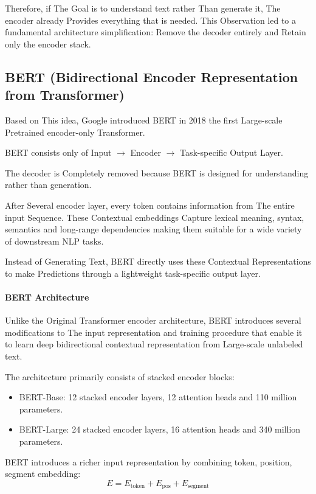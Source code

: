 Therefore, if The Goal is to understand text rather Than generate it, The encoder already Provides everything that is needed. This Observation led to a fundamental architecture simplification: Remove the decoder entirely and Retain only the encoder stack.

\subsection{BERT (Bidirectional Encoder Representation from Transformer)}

Based on This idea, Google introduced BERT in 2018 the first Large-scale Pretrained encoder-only Transformer.

BERT consists only of Input $\longrightarrow$ Encoder $\longrightarrow$ Task-specific Output Layer.

The decoder is Completely removed because BERT is designed for understanding rather than generation.

After Several encoder layer, every token contains information from The entire input Sequence. These Contextual embeddings Capture lexical meaning, syntax, semantics and long-range dependencies making them suitable for a wide variety of downstream NLP tasks.

Instead of Generating Text, BERT directly uses these Contextual Representations to make Predictions through a lightweight task-specific output layer.

\paragraph{BERT Architecture}
Unlike the Original Transformer encoder architecture, BERT introduces several modifications to The input representation and training procedure that enable it to learn deep bidirectional contextual representation from Large-scale unlabeled text.

The architecture primarily consists of stacked encoder blocks:
\begin{itemize}
    \item BERT-Base: 12 stacked encoder layers, 12 attention heads and 110 million parameters.
    \item BERT-Large: 24 stacked encoder layers, 16 attention heads and 340 million parameters.
\end{itemize}

BERT introduces a richer input representation by combining token, position, segment embedding:
\begin{equation}
E = E_{\text{token}} + E_{\text{pos}} + E_{\text{segment}}
\end{equation}

